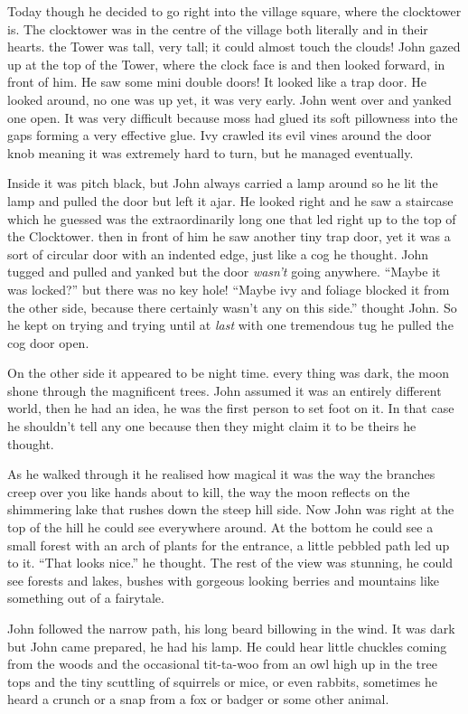 Today though he decided to go right into the village square, where the
clocktower is. The clocktower was in the centre of the village both
literally and in their hearts. the Tower was tall, very tall; it could
almost touch the clouds! John gazed up at the top of the Tower, where
the clock face is and then looked forward, in front of him. He saw some
mini double doors! It looked like a trap door. He looked around, no one
was up yet, it was very early. John went over and yanked one open. It
was very difficult because moss had glued its soft pillowness into the
gaps forming a very effective glue. Ivy crawled its evil vines around
the door knob meaning it was extremely hard to turn, but he managed
eventually.

Inside it was pitch black, but John always carried a lamp around so he
lit the lamp and pulled the door but left it ajar. He looked right and
he saw a staircase which he guessed was the extraordinarily long one
that led right up to the top of the Clocktower. then in front of him he
saw another tiny trap door, yet it was a sort of circular door with an
indented edge, just like a cog he thought. John tugged and pulled and
yanked but the door \emph{wasn't} going anywhere. ``Maybe it was
locked?'' but there was no key hole! ``Maybe ivy and foliage blocked it
from the other side, because there certainly wasn't any on this side.''
thought John. So he kept on trying and trying until at \emph{last} with
one tremendous tug he pulled the cog door open.

On the other side it appeared to be night time. every thing was dark,
the moon shone through the magnificent trees. John assumed it was an
entirely different world, then he had an idea, he was the first person
to set foot on it. In that case he shouldn't tell any one because then
they might claim it to be theirs he thought.

As he walked through it he realised how magical it was the way the
branches creep over you like hands about to kill, the way the moon
reflects on the shimmering lake that rushes down the steep hill side.
Now John was right at the top of the hill he could see everywhere
around. At the bottom he could see a small forest with an arch of plants
for the entrance, a little pebbled path led up to it. ``That looks
nice.'' he thought. The rest of the view was stunning, he could see
forests and lakes, bushes with gorgeous looking berries and mountains
like something out of a fairytale.

John followed the narrow path, his long beard billowing in the wind. It
was dark but John came prepared, he had his lamp. He could hear little
chuckles coming from the woods and the occasional tit-ta-woo from an owl
high up in the tree tops and the tiny scuttling of squirrels or mice, or
even rabbits, sometimes he heard a crunch or a snap from a fox or badger
or some other animal.

